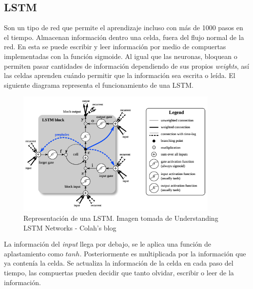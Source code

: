 \documentclass[12pt,spanish]{article}
\begin{document}
	\subsection{LSTM}
	Son un tipo de red que permite el aprendizaje incluso con más de 1000 pasos en el tiempo. Almacenan información dentro una celda, fuera del flujo normal de la red. En esta se puede escribir y leer información por medio de compuertas implementadas con la función sigmoide. Al igual que las neuronas, bloquean o permiten pasar cantidades de información dependiendo de sus propios \textit{weights}, así las celdas aprenden cuándo permitir que la información sea escrita o leída. El siguiente diagrama representa el funcionamiento de una LSTM.\\
	\begin{figure}[H]
		\centering
		\includegraphics[width=10cm]{Imagenes/lstm_structure.png}
		\begin{centering}
			\caption{Representación de una LSTM. Imagen tomada de Understanding LSTM Networks - Colah's blog}
		\end{centering}
	\end{figure}
	La información del \textit{input} llega por debajo, se le aplica una función de aplastamiento como $tanh$. Posteriormente es multiplicada por la información que ya contenía la celda. Se actualiza la información de la celda en cada paso del tiempo, las compuertas pueden decidir que tanto olvidar, escribir o leer de la información.
\end{document}
